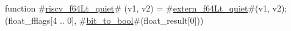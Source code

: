 function #\hyperref[sailRISCVzriscvzyf64Ltzyquiet]{riscv\_f64Lt\_quiet}# (v1, v2) = {
  #\hyperref[sailRISCVzexternzyf64Ltzyquiet]{extern\_f64Lt\_quiet}#(v1, v2);
  (float_fflags[4 .. 0], #\hyperref[sailRISCVzbitzytozybool]{bit\_to\_bool}#(float_result[0]))
}
